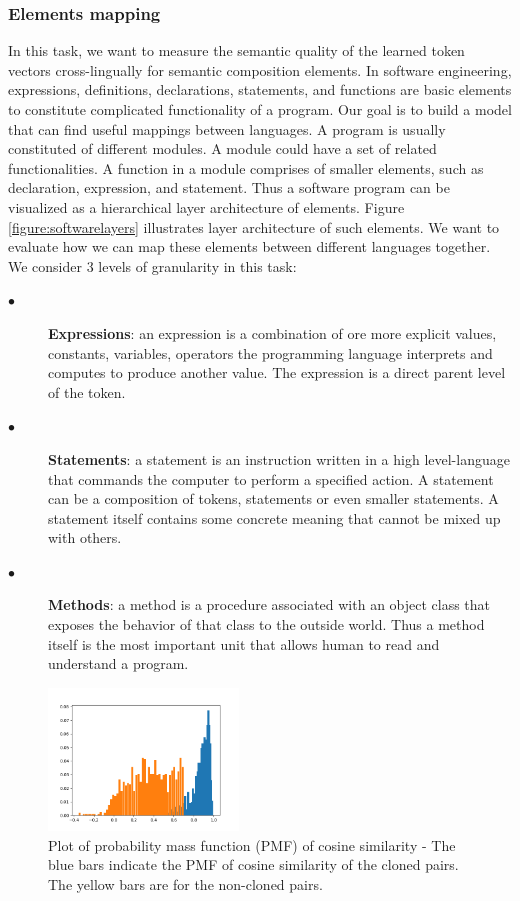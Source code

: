 \subsubsection{Elements mapping}
In this task, we want to measure the semantic quality of the learned token vectors cross-lingually for semantic composition elements. In software engineering, expressions, definitions, declarations, statements, and functions are basic elements to constitute complicated functionality of a program. Our goal is to build a model that can find useful mappings between languages. A program is usually constituted of different modules. A module could have a set of related functionalities. A function in a module comprises of smaller elements, such as declaration, expression, and statement. Thus a software program can be visualized as a hierarchical layer architecture of elements. Figure \ref{figure:softwarelayers} illustrates layer architecture of such elements. We want to evaluate how we can map these elements between different languages together. We consider 3 levels of granularity in this task:

\begin{description}
	\item [$\bullet$] \textbf{Expressions}: an expression is a combination of ore more explicit values, constants, variables, operators the programming language interprets and computes to produce another value. The expression is a direct parent level of the token.
	
	\item [$\bullet$] \textbf{Statements}: a statement is an instruction written in a high level-language that commands the computer to perform a specified action. A statement can be a composition of tokens, statements or even smaller statements. A statement itself contains some concrete meaning that cannot be mixed up with others.
	
	\item [$\bullet$] \textbf{Methods}: a method is a procedure associated with an object class that exposes the behavior of that class to the outside world. Thus a method itself is the most important unit that allows human to read and understand a program.
	
\end{description}
\begin{figure}[t!]
	\includegraphics[width=0.45\textwidth]{clone_distribution}
	\caption{Plot of probability mass function (PMF) of cosine similarity - The blue bars indicate the PMF of cosine similarity of the cloned pairs. The yellow bars are for the non-cloned pairs.}
	\label{fig:clone_distribution}
\end{figure}

